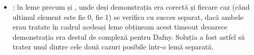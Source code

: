 \begin{sloppypar}
\begin{itemize}
    \item {}: în leme precum  și , unde deși demonstrația era corectă și fiecare caz (când ultimul element este fie 0, fie 1) se verifica cu succes separat, dacă ambele erau tratate în cadrul aceleași leme obțineam acest timeout deoarece demonstrația era destul de complexă pentru Dafny. Soluția a fost astfel să tratez unul dintre cele două cazuri posibile într-o lemă separată.
\end{itemize}

\end{sloppypar}